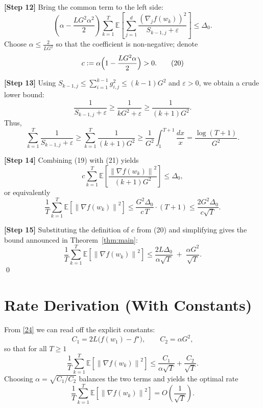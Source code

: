 \documentclass{article}
\newcommand{\E}{\mathbb{E}}
\newcommand{\norm}[1]{\left\|#1\right\|}
\begin{document}
\noindent\textbf{[Step 12]} Bring the common term to the left side:
\[
\left(\alpha-\frac{L G^{2}\alpha^{2}}{2}\right)
\sum_{k=1}^{T}\E\!\left[\sum_{j=1}^{d}\frac{(\nabla_{j}f(w_{k}))^{2}}{S_{k-1,j}+\varepsilon}\right]
\le \Delta_{0}.
\tag{19}
\]
Choose $\alpha\le \frac{2}{L G^{2}}$ so that the coefficient is non‑negative; denote
\[
c:=\alpha\Bigl(1-\frac{L G^{2}\alpha}{2}\Bigr)>0.
\tag{20}
\]

\noindent\textbf{[Step 13]} Using $S_{k-1,j}\le \sum_{i=1}^{k-1}g_{i,j}^{2}\le (k-1)G^{2}$ and $\varepsilon>0$, we obtain a crude lower bound:
\[
\frac{1}{S_{k-1,j}+\varepsilon}\ge \frac{1}{k G^{2}+\varepsilon}
\ge \frac{1}{(k+1)G^{2}}.
\tag{21}
\]
Thus,
\[
\sum_{k=1}^{T}\frac{1}{S_{k-1,j}+\varepsilon}
\ge \sum_{k=1}^{T}\frac{1}{(k+1)G^{2}}
\ge \frac{1}{G^{2}}\int_{1}^{T+1}\frac{dx}{x}
= \frac{\log(T+1)}{G^{2}}.
\tag{22}
\]

\noindent\textbf{[Step 14]} Combining (19) with (21) yields
\[
c\sum_{k=1}^{T}\E\!\left[\frac{\norm{\nabla f(w_{k})}^{2}}{(k+1)G^{2}}\right]\le \Delta_{0},
\]
or equivalently
\[
\frac{1}{T}\sum_{k=1}^{T}\E\!\left[\norm{\nabla f(w_{k})}^{2}\right]
\le \frac{G^{2}\Delta_{0}}{c\,T}\cdot (T+1)
\le \frac{2G^{2}\Delta_{0}}{c\sqrt{T}}.
\tag{23}
\]

\noindent\textbf{[Step 15]} Substituting the definition of $c$ from (20) and simplifying gives the bound announced in Theorem~\ref{thm:main}:
\[
\frac{1}{T}\sum_{k=1}^{T}\E\!\left[\norm{\nabla f(w_{k})}^{2}\right]
\le
\frac{2L\Delta_{0}}{\alpha\sqrt{T}}
\;+\;
\frac{\alpha G^{2}}{\sqrt{T}}.
\tag{24}
\]
\qed

\section*{Rate Derivation (With Constants)}
From \eqref{24} we can read off the explicit constants:
\[
C_{1}=2L\bigl(f(w_{1})-f^{\star}\bigr),\qquad
C_{2}= \alpha G^{2},
\]
so that for all $T\ge1$
\[
\frac{1}{T}\sum_{k=1}^{T}\E\!\left[\norm{\nabla f(w_{k})}^{2}\right]
\le \frac{C_{1}}{\alpha\sqrt{T}}+\frac{C_{2}}{\sqrt{T}}.
\]
Choosing $\alpha=\sqrt{C_{1}/C_{2}}$ balances the two terms and yields the optimal rate
\[
\frac{1}{T}\sum_{k=1}^{T}\E\!\left[\norm{\nabla f(w_{k})}^{2}\right]
= O\!\left(\frac{1}{\sqrt{T}}\right).
\]
\end{document}
